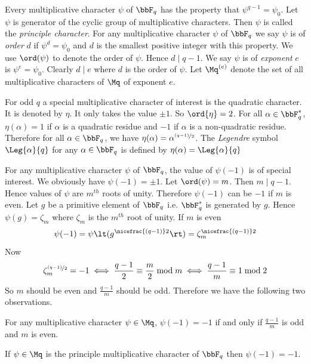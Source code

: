 Every multiplicative character $\psi$ of $\bbF_q$ has the property that $\psi^{q-1}=\psi_0$. Let $\psi$ is generator of the cyclic group of multiplicative characters. Then $\psi$ is called the \emph{principle character}. For any multiplicative character $\psi$ of $\bbF_q$ we say $\psi$ is of \emph{order} $d$ if $\psi^d=\psi_0$ and $d$ is the smallest positive integer with this property. We use $\ord(\psi)$ to denote the order of $\psi$. Hence $d\mid q-1$. We say $\psi$ is of \emph{exponent} $e$ is $\psi^e=\psi_0$. Clearly $d\mid e$ where $d$ is the order of $\psi$. Let $\Mq^{(e)}$ denote the set of all multiplicative characters of $\Mq$ of exponent $e$. 

\begin{remark}
  For odd $q$ a special multiplicative character of interest is the quadratic character. It is denoted by $\eta$. It only takes the value $\pm1$. So $\ord{\eta}=2$. For all $\alpha\in \bbF_q^*$, $\eta(\alpha)=1$ if $\alpha$ is a quadratic residue and $-1$ if $\alpha$ is a non-quadratic residue. Therefore for all $\alpha\in\bbF_q$, we have $\eta(\alpha)=\alpha^{\nicefrac{(q-1)}{2}}$. The \emph{Legendre} symbol $\Leg{\alpha}{q}$ for any $\alpha\in\bbF_q$ is defined by $\eta(\alpha)=\Leg{\alpha}{q}$
\end{remark}

For any multiplicative character $\psi$ of $\bbF_q$, the value of $\psi(-1)$ is of special interest. We obviously have $\psi(-1)=\pm 1$. Let $\ord(\psi)=m$. Then $m\mid q-1$. Hence values of $\psi$ are $m^{th}$ roots of unity. Therefore $\psi(-1)$ can be $-1$ if $m$ is even. Let $g$ be a primitive element of $\bbF_q$ i.e. $\bbF_q^*$ is generated by $g$. Hence $\psi(g)=\zeta_m$ where $\zeta_m$ is the $m^{th}$ root of unity. If $m$ is even $$\psi(-1)=\psi\lt(g^{\nicefrac{(q-1)}2}\rt)=\zeta_m^{\nicefrac{(q-1)}2}$$Now $$\zeta_m^{\nicefrac{(q-1)}2}=-1 \iff \frac{q-1}2\equiv \frac{m}2\bmod m \iff \frac{q-1}m\equiv 1\bmod 2$$So $m$ should be even and $\frac{q-1}m$ should be odd. Therefore we have the following two observations.

\begin{observation}\label{obs:char-at--1}
  For any multiplicative character $\psi\in\Mq$, $\psi(-1)=-1$ if and only if $\frac{q-1}m$ is odd and $m$ is even.
\end{observation}
\begin{observation}
  If $\psi\in\Mq$ is the principle multiplicative character of $\bbF_q$ then $\psi(-1)=-1$. 
\end{observation}


